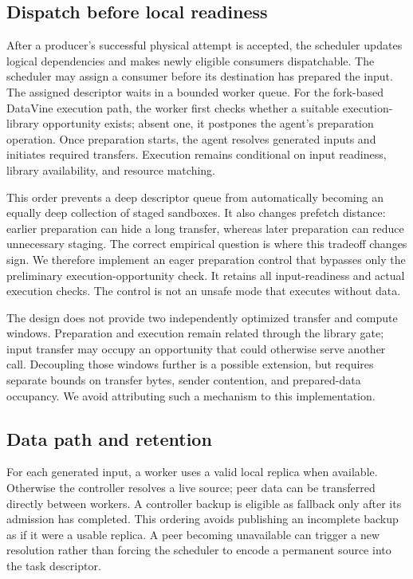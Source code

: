 \subsection{Dispatch before local readiness}
After a producer's successful physical attempt is accepted, the scheduler
updates logical dependencies and makes newly eligible consumers dispatchable.
The scheduler may assign a consumer before its destination has prepared the
input. The assigned descriptor waits in a bounded worker queue. For the
fork-based DataVine execution path, the worker first checks whether a suitable
execution-library opportunity exists; absent one, it postpones the agent's
preparation operation. Once preparation starts, the agent resolves generated
inputs and initiates required transfers. Execution remains conditional on
input readiness, library availability, and resource matching.

This order prevents a deep descriptor queue from automatically becoming an
equally deep collection of staged sandboxes. It also changes prefetch distance:
earlier preparation can hide a long transfer, whereas later preparation can
reduce unnecessary staging. The correct empirical question is where this
tradeoff changes sign. We therefore implement an eager preparation control
that bypasses only the preliminary execution-opportunity check. It retains
all input-readiness and actual execution checks. The control is not an unsafe
mode that executes without data.

The design does not provide two independently optimized transfer and compute
windows. Preparation and execution remain related through the library gate;
input transfer may occupy an opportunity that could otherwise serve another
call. Decoupling those windows further is a possible extension, but requires
separate bounds on transfer bytes, sender contention, and prepared-data
occupancy. We avoid attributing such a mechanism to this implementation.

\subsection{Data path and retention}
For each generated input, a worker uses a valid local replica when available.
Otherwise the controller resolves a live source; peer data can be transferred
directly between workers. A controller backup is eligible as fallback only
after its admission has completed. This ordering avoids publishing an
incomplete backup as if it were a usable replica. A peer becoming unavailable
can trigger a new resolution rather than forcing the scheduler to encode a
permanent source into the task descriptor.

